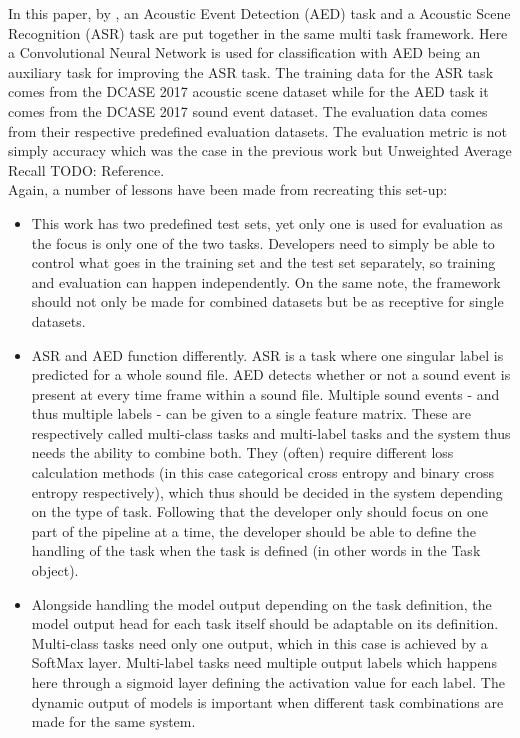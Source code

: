 In this paper, by \citet{xu2019multi}, an Acoustic Event Detection (AED) task and a Acoustic Scene Recognition (ASR) task are put together in the same multi task framework. Here a Convolutional Neural Network is used for classification with AED being an auxiliary task for improving the ASR task. The training data for the ASR task comes from the DCASE 2017 acoustic scene dataset while for the AED task it comes from the DCASE 2017 sound event dataset. The evaluation data comes from their respective predefined evaluation datasets. The evaluation metric is not simply accuracy which was the case in the previous work but Unweighted Average Recall TODO: Reference.\\

Again, a number of lessons have been made from recreating this set-up:

\begin{itemize}
	\item This work has two predefined test sets, yet only one is used for evaluation as the focus is only one of the two tasks. Developers need to simply be able to control what goes in the training set and the test set separately, so training and evaluation can happen independently. On the same note, the framework should not only be made for combined datasets but be as receptive for single datasets.
	\item ASR and AED function differently. ASR is a task where one singular label is predicted for a whole sound file. AED detects whether or not a sound event is present at every time frame within a sound file. Multiple sound events - and thus multiple labels - can be given to a single feature matrix. These are respectively called multi-class tasks and multi-label tasks and the system thus needs the ability to combine both. They (often) require different loss calculation methods (in this case categorical cross entropy and binary cross entropy respectively), which thus should be decided in the system depending on the type of task. Following that the developer only should focus on one part of the pipeline at a time, the developer should be able to define the handling of the task when the task is defined (in other words in the Task object).
	\item Alongside handling the model output depending on the task definition, the model output head for each task itself should be adaptable on its definition. Multi-class tasks need only one output, which in this case is achieved by a SoftMax layer. Multi-label  tasks need multiple output labels which happens here through a sigmoid layer defining the activation value for each label. The dynamic output of models is important when different task combinations are made for the same system.

\end{itemize}
